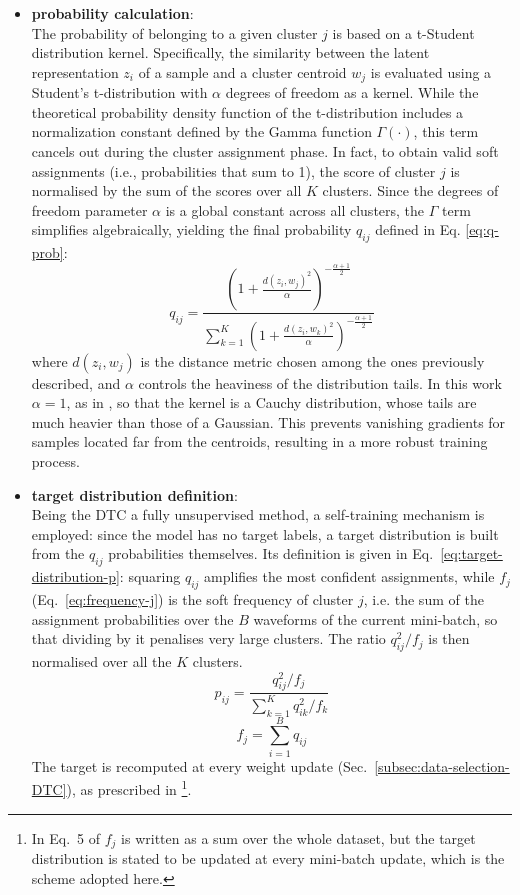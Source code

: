 \begin{itemize}
    \item \textbf{probability calculation}:\\
    The probability of belonging to a given cluster $j$ is based on a t-Student distribution kernel. Specifically, the similarity between the latent representation $z_i$ of a sample and a cluster centroid $w_j$ is evaluated using a Student's t-distribution with $\alpha$ degrees of freedom as a kernel. While the theoretical probability density function of the t-distribution includes a normalization constant defined by the Gamma function $\Gamma(\cdot)$, this term cancels out during the cluster assignment phase. In fact, to obtain valid soft assignments (i.e., probabilities that sum to 1), the score of cluster $j$ is normalised by the sum of the scores over all $K$ clusters. Since the degrees of freedom parameter $\alpha$ is a global constant across all clusters, the $\Gamma$ term simplifies algebraically, yielding the final probability $q_{ij}$ defined in Eq. \ref{eq:q-prob}:
    \begin{equation}
        \label{eq:q-prob}
        q_{ij} = \frac{\left( 1 + \frac{d(z_i, w_j)^2}{\alpha} \right)^{-\frac{\alpha+1}{2}}}{\sum_{k=1}^{K} \left( 1 + \frac{d(z_i, w_k)^2}{\alpha} \right)^{-\frac{\alpha+1}{2}}}
    \end{equation}
    where $d(z_i, w_j)$ is the distance metric chosen among the ones previously described, and $\alpha$ controls the heaviness of the distribution tails. In this work $\alpha = 1$, as in \cite{DTC}, so that the kernel is a Cauchy distribution, whose tails are much heavier than those of a Gaussian. This prevents vanishing gradients for samples located far from the centroids, resulting in a more robust training process.

    \item \textbf{target distribution definition}:\\
    Being the \ac{DTC} a fully unsupervised method, a self-training mechanism is employed: since the model has no target labels, a target distribution is built from the $q_{ij}$ probabilities themselves. Its definition is given in Eq.~\ref{eq:target-distribution-p}: squaring $q_{ij}$ amplifies the most confident assignments, while $f_j$ (Eq.~\ref{eq:frequency-j}) is the soft frequency of cluster $j$, i.e. the sum of the assignment probabilities over the $B$ waveforms of the current mini-batch, so that dividing by it penalises very large clusters. The ratio $q^{2}_{ij}/f_j$ is then normalised over all the $K$ clusters.
    \begin{equation}
        \label{eq:target-distribution-p}
        p_{ij} = \frac{q^{2}_{ij} / f_j}{\sum_{k=1}^{K} q^{2}_{ik} / f_k}
    \end{equation}
    \begin{equation}
        \label{eq:frequency-j}
        f_j = \sum_{i=1}^{B} q_{ij}
    \end{equation}
    The target is recomputed at every weight update (Sec.~\ref{subsec:data-selection-DTC}), as prescribed in \cite{DTC}\footnote{In Eq.~5 of \cite{DTC} $f_j$ is written as a sum over the whole dataset, but the target distribution is stated to be updated at every mini-batch update, which is the scheme adopted here.}.


\end{itemize}
